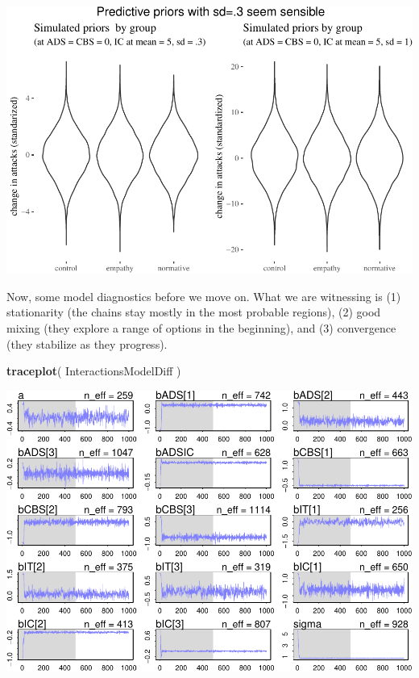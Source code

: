 \documentclass[10pt,dvipsnames,enabledeprecatedfontcommands]{scrartcl}
\newenvironment{Shaded}{\begin{snugshade}}{\end{snugshade}}
\newcommand{\KeywordTok}[1]{\textcolor[rgb]{0.13,0.29,0.53}{\textbf{#1}}}
\newcommand{\NormalTok}[1]{#1}
\begin{document}
\begin{center}\includegraphics[width=1\linewidth]{bayesianReport3_files/figure-latex/priors03-1} \end{center}

\normalsize

Now, some model diagnostics before we move on. What we are witnessing is
(1) stationarity (the chains stay mostly in the most probable regions),
(2) good mixing (they explore a range of options in the beginning), and
(3) convergence (they stabilize as they progress).

\vspace{1mm} \footnotesize

\begin{Shaded}
\begin{Highlighting}[]
\KeywordTok{traceplot}\NormalTok{( InteractionsModelDiff )}
\end{Highlighting}
\end{Shaded}

\begin{center}\includegraphics[width=1\linewidth]{bayesianReport3_files/figure-latex/unnamed-chunk-6-1} \end{center}
\end{document}
